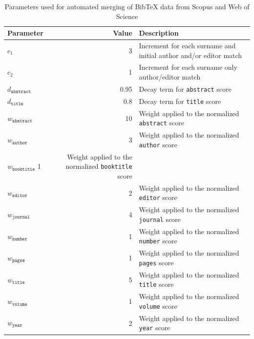 \begin{table}[!t]
	\centering
	\begin{tabular}{lrp{9cm}}
    	\toprule
        Parameter & Value & Description \\
    	\midrule
        $c_1$ & 3 & Increment for each surname and initial author and/or editor match \\
        $c_2$ & 1 & Increment for each surname only author/editor match \\
        $d_\texttt{abstract}$ & 0.95 & Decay term for \texttt{abstract} score \\
        $d_\texttt{title}$ & 0.8 & Decay term for \texttt{title} score \\
        $w_\texttt{abstract}$ & 10 & Weight applied to the normalized \texttt{abstract} score \\
        $w_\texttt{author}$ & 3 & Weight applied to the normalized \texttt{author} score \\
        $w_\texttt{booktitle}$ 1 & Weight applied to the normalized \texttt{booktitle} score \\
        $w_\texttt{editor}$ & 2 & Weight applied to the normalized \texttt{editor} score \\
        $w_\texttt{journal}$ & 4 & Weight applied to the normalized \texttt{journal} score \\
        $w_\texttt{number}$ & 1 & Weight applied to the normalized \texttt{number} score \\
        $w_\texttt{pages}$ & 1 & Weight applied to the normalized \texttt{pages} score \\
        $w_\texttt{title}$ & 5 & Weight applied to the normalized \texttt{title} score \\
        $w_\texttt{volume}$ & 1 & Weight applied to the normalized \texttt{volume} score \\
        $w_\texttt{year}$ & 2 & Weight applied to the normalized \texttt{year} score \\
    	\bottomrule			
	\end{tabular}
	\caption{Parameters used for automated merging of BibTeX data from Scopus and Web of Science}
	\label{tab:merge-parameters}	
\end{table}
